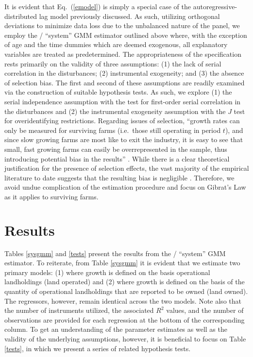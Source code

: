 \documentclass[english]{article}
\begin{document}
It is evident that Eq.\ (\ref{emodel}) is simply a special case of the autoregressive-distributed lag model previously discussed. As such, utilizing orthogonal deviations to minimize data loss due to the unbalanced nature of the panel, we employ the \citet{arellano1995}/\citet{blundell1998} ``system'' GMM estimator outlined above where, with the exception of age and the time dummies which are deemed exogenous, all explanatory variables are treated as predetermined. The appropriateness of the specification rests primarily on the validity of three assumptions: (1) the lack of serial correlation in the disturbances; (2) instrumental exogeneity; and (3) the absence of selection bias. The first and second of these assumptions are readily examined via the construction of suitable hypothesis tests. As such, we explore (1) the serial independence assumption with the \citet{arellano1991} test for first-order serial correlation in the disturbances and (2) the instrumental exogeneity assumption with the \citet{hansen1982} $J$ test for overidentifying restrictions. Regarding issues of selection, ``growth rates can only be measured for surviving farms (i.e.\ those still operating in period $t$), and since slow growing farms are most like to exit the industry, it is easy to see that small, fast growing farms can easily be overrepresented in the sample, thus introducing potential bias in the results'' \citep[pg.\ 790]{bakucs2009}. While there is a clear theoretical justification for the presence of selection effects, the vast majority of the empirical literature to date suggests that the resulting bias is negligible \citep{evans1987, hall1987, weiss1999, dries2004}. Therefore, we avoid undue complication of the estimation procedure and focus on Gibrat's Law as it applies to surviving farms.


\section{Results}
\label{sec: results}

Tables \ref{sysgmm} and \ref{tests} present the results from the \citet{arellano1995}/\citet{blundell1998} ``system'' GMM estimator. To reiterate, from Table \ref{sysgmm} it is evident that we estimate two primary models: (1) where growth is defined on the basis operational landholdings (land operated) and (2) where growth is defined on the basis of the quantity of operational landholdings that are reported to be owned (land owned). The regressors, however, remain identical across the two models. Note also that the number of instruments utilized, the associated $R^2$ values, and the number of observations are provided for each regression at the bottom of the corresponding column. To get an understanding of the parameter estimates as well as the validity of the underlying assumptions, however, it is beneficial to focus on Table \ref{tests}, in which we present a series of related hypothesis tests.
\end{document}
